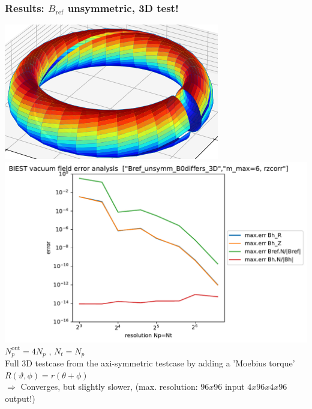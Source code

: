 \documentclass[aspectratio=169]{beamer}
\newcommand{\textc}[1]{\textcolor{iagcolor}{#1}}
\newcommand{\thet}{\vartheta}
\begin{document}
\begin{frame}
 \frametitle{Results: $B_\text{ref}$ unsymmetric, 3D test! }
  \small\centering
  \includegraphics[height=0.4\textheight]{pics/Bref_unsymm_screw1_surf.png}\hspace*{-1cm}
 \includegraphics[height=0.7\textheight]{pics/BIEST_vf_err_Bref_unsymm_B0differs_3Dscrew1_m_max=6_rzcorr.pdf}\\$N_p^\text{out}=4 N_p$ , \textc{$N_t=N_p$}
  \\
  \textc{Full 3D} testcase from the axi-symmetric testcase by adding a 'Moebius torque' $R(\thet,\phi)=r(\theta + \phi)$ \\
  \textc{$\Rightarrow$ Converges, but slightly slower, } (max. resolution: $96x96$ input $4x96x4x96$ output!)
\end{frame}
% 
\end{document}
